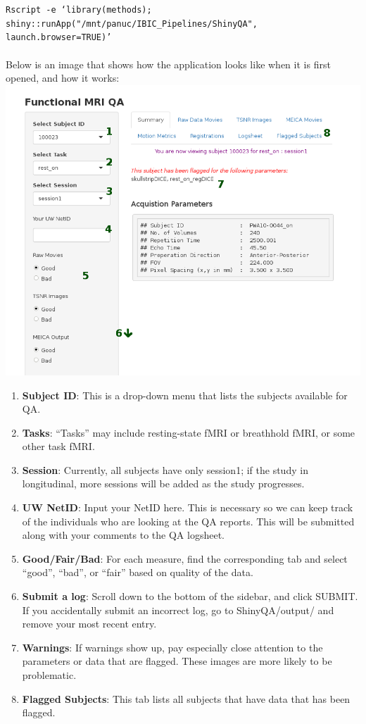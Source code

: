 \documentclass[12pt]{article}
\begin{document}
\texttt{Rscript -e `library(methods);\ } \\
\indent\texttt{shiny::runApp("/mnt/panuc/IBIC\_Pipelines/ShinyQA", launch.browser=TRUE)'}
\\\\
Below is an image that shows how the application looks like when it is first opened, and how it works: 
\newline
\includegraphics[scale=0.5]{shiny_summary_numbered.png}

\begin{enumerate}
	\item \textbf{Subject ID}: This is a drop-down menu that lists the subjects available for QA.
	\item \textbf{Tasks}: ``Tasks'' may include resting-state fMRI or breathhold fMRI, or some other task fMRI.
	\item \textbf{Session}: Currently, all subjects have only session1; if the study in longitudinal, more sessions will be added as the study progresses.
	\item \textbf{UW NetID}: Input your NetID here. This is necessary so we can keep track of the individuals who are looking at the QA reports. This will be submitted along with your comments to the QA logsheet.
	\item \textbf{Good/Fair/Bad}: For each measure, find the corresponding tab and select ``good'', ``bad'', or ``fair'' based on quality of the data. 
	\item \textbf{Submit a log}: Scroll down to the bottom of the sidebar, and click SUBMIT. If you accidentally submit an incorrect log, go to ShinyQA/output/ and remove your most recent entry. 
	\item \textbf{Warnings}: If warnings show up, pay especially close attention to the parameters or data that are flagged. These images are more likely to be problematic.
	\item \textbf{Flagged Subjects}: This tab lists all subjects that have data that has been flagged. 
\end{enumerate}
\end{document}
